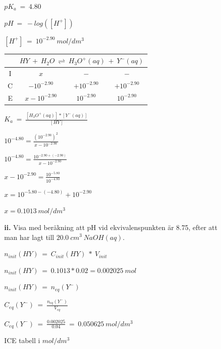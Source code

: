 \documentclass[12pt, letterpaper, twoside]{article}
\begin{document}
\begin{flushleft}
\begin{itemize}
\begin{itemize}
$ pK_a\ =\ 4.80 $

$ pH\ =\ -log([H^+]) $

$ [H^+]\ =\ 10^{-2.90}\ mol/dm^3 $

\hfill
\hfill

\renewcommand{\arraystretch}{1.5}
\begin{tabular}{ |c|c|c|c| }
 \hline
   & \multicolumn{3}{c|}{ $ HY\ +\ H_2O\ \rightleftharpoons\ H_3O^+(aq)\ +\ Y^-(aq) $} \\
 \hline
 I & \hspace{1.25cm} $ x $ \hspace{1.2cm} & $ - $ & $ - $ \\
 \hline
 C & $ -10^{-2.90} $ & $ +10^{-2.90} $ & $ +10^{-2.90} $ \\
 \hline
 E & $ x-10^{-2.90} $ & \hspace{0.4cm} $ 10^{-2.90} $ \hspace{0.4cm} & $ 10^{-2.90} $ \\
 \hline
\end{tabular}

\hfill

$ K_a\ =\ \frac{[H_3O^+(aq)]*[Y^-(aq)]}{[HY]} $

$ 10^{-4.80} = \frac{(10^{-2.90})^2}{x-10^{-2.90}} $

$ 10^{-4.80} = \frac{10^{-2.90+(-2.90)}}{x-10^{-2.90}} $

$ x-10^{-2.90} = \frac{10^{-5.80}}{10^{-4.80}} $

$ x = 10^{-5.80-(-4.80)}+10^{-2.90} $

$ x = 0.1013\ mol/dm^3 $

\pagebreak

\item[\textbf{ii.}] Visa med beräkning att pH vid ekvivalenspunkten är 8.75,
efter att man har lagt till $ 20.0\ cm^3\ NaOH(aq) $.

\hfill
\hfill

$ n_{init}(HY)\ =\ C_{init}(HY)\ *\ V_{init} $

$ n_{init}(HY)\ =\ 0.1013*0.02=0.002025\ mol $

$ n_{init}(HY)\ =\ n_{eq}(Y^-) $

$ C_{eq}(Y^-)\ =\ \frac{n_{eq}(Y^-)}{V_{eq}} $

$ C_{eq}(Y^-)\ =\ \frac{0.002025}{0.04}\ =\ 0.050625\ mol/dm^3 $

\hfill

ICE tabell i $ mol/dm^3 $


\end{itemize}
\end{itemize}
\end{flushleft}
\end{document}
